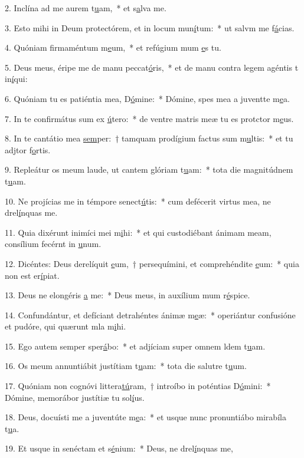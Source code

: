 2. Inclína ad me aurem t\uline{u}am,~* et s\uline{a}lva me.\par 
3. Esto mihi in Deum protectórem, et in locum mun\uline{í}tum:~* ut salvm me f\uline{á}cias.\par 
4. Quóniam firmaméntum m\uline{e}um,~* et refúgium mum \uline{e}s tu.\par 
5. Deus meus, éripe me de manu peccat\uline{ó}ris,~* et de manu contra legem agéntis t in\uline{í}qui:\par 
6. Quóniam tu es patiéntia mea, D\uline{ó}mine:~* Dómine, spes mea a juventte m\uline{e}a.\par 
7. In te confirmátus sum ex \uline{ú}tero:~* de ventre matris meæ tu es protctor m\uline{e}us.\par 
8. In te cantátio mea \uline{sem}per:~† tamquam prodígium factus sum m\uline{u}ltis:~* et tu adjtor f\uline{o}rtis.\par 
9. Repleátur os meum laude, ut cantem glóriam t\uline{u}am:~* tota die magnitúdnem t\uline{u}am.\par 
10. Ne projícias me in témpore senect\uline{ú}tis:~* cum defécerit virtus mea, ne drel\uline{í}nquas me.\par 
11. Quia dixérunt inimíci mei m\uline{i}hi:~* et qui custodiébant ánimam meam, consílium fecérnt in \uline{u}num.\par 
12. Dicéntes: Deus derelíquit \uline{e}um,~† persequímini, et comprehéndite \uline{e}um:~* quia non est  er\uline{í}piat.\par 
13. Deus ne elongéris \uline{a} me:~* Deus meus, in auxílium mum r\uline{é}spice.\par 
14. Confundántur, et defíciant detrahéntes ánimæ m\uline{e}æ:~* operiántur confusióne et pudóre, qui quærunt mla m\uline{i}hi.\par 
15. Ego autem semper sper\uline{á}bo:~* et adjíciam super omnem ldem t\uline{u}am.\par 
16. Os meum annuntiábit justítiam t\uline{u}am:~* tota die salutre t\uline{u}um.\par 
17. Quóniam non cognóvi littera\uline{tú}ram,~† introíbo in poténtias D\uline{ó}mini:~* Dómine, memorábor justítiæ tu sol\uline{í}us.\par 
18. Deus, docuísti me a juventúte m\uline{e}a:~* et usque nunc pronuntiábo mirabíla t\uline{u}a.\par 
19. Et usque in senéctam et s\uline{é}nium:~* Deus, ne drel\uline{í}nquas me,\par 
